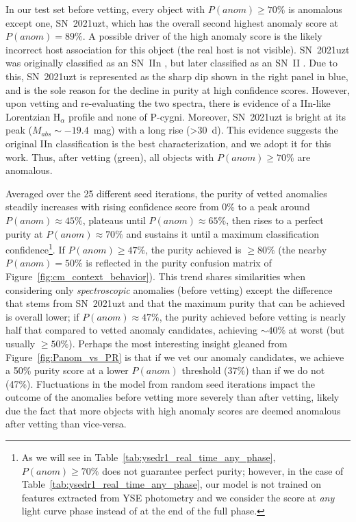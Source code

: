 \documentclass[twocolumn]{aastex63}
\begin{document}
In our test set before vetting, every object with $P(anom)\geq70\%$ is anomalous except one, SN~2021uzt, which has the overall second highest anomaly score at $P(anom)=89\%$. A possible driver of the high anomaly score is the likely incorrect host association for this object (the real host is not visible). SN~2021uzt was originally classified as an SN~IIn \citep{TuckerTNS2021uzt}, but later classified as an SN~II \citep{ChuTNS2021uzt}. Due to this, SN~2021uzt is represented as the sharp dip shown in the right panel in blue, and is the sole reason for the decline in purity at high confidence scores. However, upon vetting and re-evaluating the two spectra, there is evidence of a IIn-like Lorentzian H$_{\alpha}$ profile and none of P-cygni. Moreover, SN~2021uzt is bright at its peak ($M_{abs}\sim-19.4$~mag) with a long rise (\textgreater30~d). This evidence suggests the original IIn classification is the best characterization, and we adopt it for this work. Thus, after vetting (green), all objects with $P(anom)\geq70\%$ are anomalous. \par 

Averaged over the 25 different seed iterations, the purity of vetted anomalies steadily increases with rising confidence score from 0\% to a peak around $P(anom)\approx45\%$, plateaus until $P(anom)\approx65\%$, then rises to a perfect purity at $P(anom)\approx70\%$ and sustains it until a maximum classification confidence\footnote{As we will see in Table~\ref{tab:ysedr1_real_time_any_phase}, $P(anom)\geq70\%$ does not guarantee perfect purity; however, in the case of Table~\ref{tab:ysedr1_real_time_any_phase}, our model is not trained on features extracted from YSE photometry and we consider the score at \emph{any} light curve phase instead of at the end of the full phase.}. If $P(anom)\geq47\%$, the purity achieved is $\geq80\%$ (the nearby $P(anom)=50\%$ is reflected in the purity confusion matrix of Figure~\ref{fig:cm_context_behavior}). This trend shares similarities when considering only \emph{spectroscopic} anomalies (before vetting) except the difference that stems from SN~2021uzt and that the maximum purity that can be achieved is overall lower; if $P(anom)\approx47\%$, the purity achieved before vetting is nearly half that compared to vetted anomaly candidates, achieving $\sim40\%$ at worst (but usually $\geq50\%$). Perhaps the most interesting insight gleaned from Figure~\ref{fig:Panom_vs_PR} is that if we vet our anomaly candidates, we achieve a 50\% purity score at a lower $P(anom)$ threshold (37\%) than if we do not (47\%). Fluctuations in the model from random seed iterations impact the outcome of the anomalies before vetting more severely than after vetting, likely due the fact that more objects with high anomaly scores are deemed anomalous after vetting than vice-versa. \par
\end{document}

